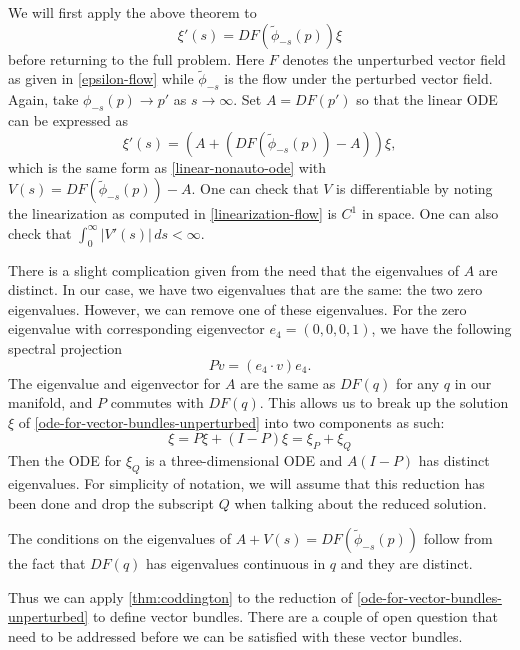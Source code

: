 We will first apply the above theorem to 
\begin{equation}\label{flow-for-tangent-vectors-unperturbed}
	\xi'(s) = DF(\tilde \phi_{-s}(p)) \xi
\end{equation}
before returning to the full problem. Here \(F\) denotes the unperturbed vector field as given in \cref{epsilon-flow} while \(\tilde\phi_{-s}\) is the flow under the perturbed vector field. Again, take \(\phi_{-s}(p) \to p'
\) as \(s\to \infty\). Set \(A = DF(p')\) so that the linear ODE can be expressed as
\begin{equation}\label{ode-for-vector-bundles-unperturbed}
	\xi'(s) = (A + (DF(\tilde \phi_{-s}(p)) - A)) \xi,
\end{equation}
which is the same form as \cref{linear-nonauto-ode} with \(V(s) = DF(\tilde \phi_{-s}(p)) - A\). One can check that \(V\) is differentiable by noting the linearization as computed in \cref{linearization-flow} is \(C^1\) in space. One can also check that \(\int_{0}^\infty |V'(s)|\, ds < \infty\).

There is a slight complication given from the need that the eigenvalues of \(A\) are distinct. In our case, we have two eigenvalues that are the same: the two zero eigenvalues. However, we can remove one of these eigenvalues. For the zero eigenvalue with corresponding eigenvector \(e_4 = (0, 0, 0, 1)\), we have the following spectral projection
\begin{equation}
	P v = (e_4 \cdot v) e_4.
\end{equation}
The eigenvalue and eigenvector for \(A\) are the same as \(DF(q)\) for any \(q\) in our manifold, and \(P\) commutes with \(DF(q)\). This allows us to break up the solution \(\xi\) of \cref{ode-for-vector-bundles-unperturbed} into two components as such:
\begin{equation}
	\xi = P\xi + (I-P)\xi = \xi_P + \xi_Q
\end{equation}
Then the ODE for \(\xi_Q\) is a three-dimensional ODE and \(A(I-P)\) has distinct eigenvalues. For simplicity of notation, we will assume that this reduction has been done and drop the subscript \(Q\) when talking about the reduced solution.

The conditions on the eigenvalues of \(A+V(s) = DF(\tilde\phi_{-s}(p))\) follow from the fact that \(DF(q)\) has eigenvalues continuous in \(q\) and they are distinct.

Thus we can apply \cref{thm:coddington} to the reduction of \cref{ode-for-vector-bundles-unperturbed} to define vector bundles. There are a couple of open question that need to be addressed before we can be satisfied with these vector bundles. 

